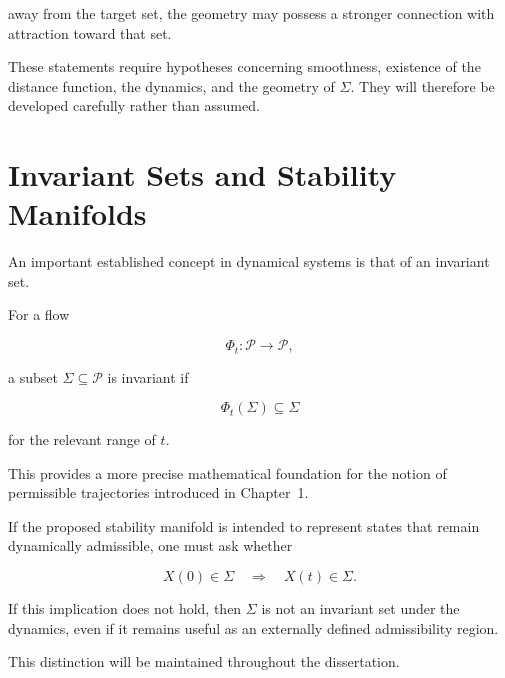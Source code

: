 \documentclass[12pt,oneside]{book}
\begin{document}
away from the target set, the geometry may possess a stronger
connection with attraction toward that set.

These statements require hypotheses concerning smoothness,
existence of the distance function, the dynamics, and the
geometry of \(\Sigma\). They will therefore be developed
carefully rather than assumed.


\section{Invariant Sets and Stability Manifolds}
\label{sec:invariant-sets-history}

An important established concept in dynamical systems is that of
an invariant set.

For a flow

\begin{equation}
    \Phi_t:
    \mathcal{P}
    \rightarrow
    \mathcal{P},
\end{equation}

a subset \(\Sigma\subseteq\mathcal{P}\) is invariant if

\begin{equation}
    \Phi_t(\Sigma)
    \subseteq
    \Sigma
    \label{eq:invariant-set}
\end{equation}

for the relevant range of \(t\).

This provides a more precise mathematical foundation for the
notion of permissible trajectories introduced in Chapter~1.

If the proposed stability manifold is intended to represent
states that remain dynamically admissible, one must ask whether

\begin{equation}
    X(0)\in\Sigma
    \quad\Longrightarrow\quad
    X(t)\in\Sigma.
    \label{eq:stability-manifold-invariance}
\end{equation}

If this implication does not hold, then \(\Sigma\) is not an
invariant set under the dynamics, even if it remains useful as
an externally defined admissibility region.

This distinction will be maintained throughout the
dissertation.

\end{document}
